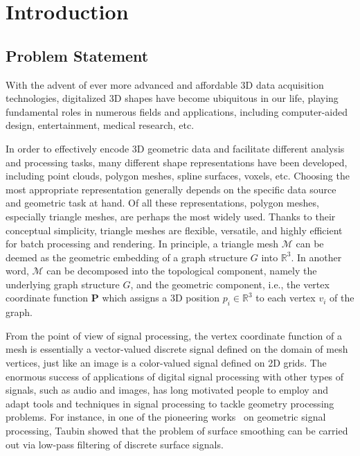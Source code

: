 \chapter{Introduction}

\section{Problem Statement}

With the advent of ever more advanced and affordable 3D data acquisition
technologies, digitalized 3D shapes have become ubiquitous in our life,
playing fundamental roles in numerous fields and applications, including
computer-aided design, entertainment, medical research, etc.

In order to effectively encode 3D geometric data and facilitate different analysis
and processing tasks, many different shape representations have been developed,
including point clouds, polygon meshes, spline surfaces, voxels, etc. Choosing the
most appropriate representation generally depends on the specific data source and
geometric task at hand. Of all these representations, polygon meshes, especially
triangle meshes, are perhaps the most widely used. Thanks to their conceptual
simplicity, triangle meshes are flexible, versatile, and highly efficient for batch
processing and rendering. In principle, a triangle mesh $\mathcal{M}$ can be deemed
as the geometric embedding of a graph structure $G$ into $\mathbb{R}^3$. In another word,
$\mathcal{M}$ can be decomposed into the topological component, namely the underlying
graph structure $G$, and the geometric component, i.e., the vertex coordinate function
$\mathbf{P}$ which assigns a 3D position $p_i\in\mathbb{R}^3$ to each vertex $v_i$ of
the graph.


From the point of view of signal processing, the vertex coordinate function of a mesh
is essentially a vector-valued discrete signal defined on the domain of mesh vertices,
just like an image is a color-valued signal defined on 2D grids. The enormous success
of applications of digital signal processing with other types of signals, such as audio
and images, has long motivated people to employ and adapt tools and techniques in signal
processing to tackle geometry processing problems. For instance, in one of the pioneering
works~\cite{Taubin1995} on geometric signal processing, Taubin showed that the problem of
surface smoothing can be carried out via low-pass filtering of discrete surface signals.

